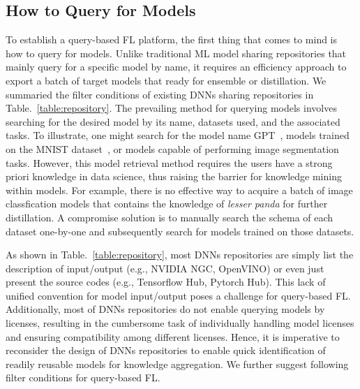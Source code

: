 
\subsection{How to Query for Models}
\label{sec:how2query}
To establish a query-based FL platform, the first thing that comes to mind is how to query for models.
Unlike traditional ML model sharing repositories that mainly query for a specific model by name, it requires an efficiency approach to export a batch of target models that ready for ensemble or distillation.
We summaried the filter conditions of existing DNNs sharing repositories in Table.~\ref{table:repository}.
The prevailing method for querying models involves searching for the desired model by its name, datasets used, and the associated tasks.
To illustrate, one might search for the model name GPT~\cite{radford2019language}, models trained on the MNIST dataset~\cite{lecun2010mnist}, or models capable of performing image segmentation tasks.
However, this model retrieval method requires the users have a strong priori knowledge in data science, thus raising the barrier for knowledge mining within models.
For example, there is no effective way to acquire a batch of image classfication models that contains the knowledge of \textit{lesser panda} for further distillation.
A compromise solution is to manually search the schema of each dataset one-by-one and subsequently search for models trained on those datasets.

As shown in Table.~\ref{table:repository}, most DNNs repositories are simply list the description of input/output (e.g., NVIDIA NGC, OpenVINO) or even just present the source codes (e.g., Tensorflow Hub, Pytorch Hub).
This lack of unified convention for model input/output poses a challenge for query-based FL.
Additionally, most of DNNs repositories do not enable querying models by licenses, resulting in the cumbersome task of individually handling model licenses and ensuring compatibility among different licenses.
Hence, it is imperative to reconsider the design of DNNs repositories to enable quick identification of readily reusable models for knowledge aggregation. We further suggest following filter conditions for query-based FL.

